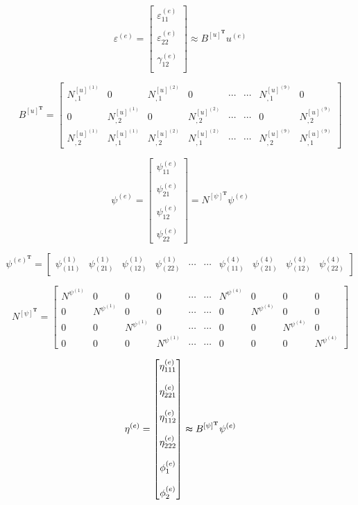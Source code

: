 \documentclass{article}
\begin{document}
\[
\varepsilon^{(e)}=
\begin{bmatrix}
\varepsilon_{11}^{(e)} \\
\\
\varepsilon_{22}^{(e)}  \\
\\
\gamma_{12}^{(e)}  \\ 
\end{bmatrix}
\approx B^{[u]^{\textbf{T}}}u^{(e)}
\]

\[
B^{[u]^\textbf{T}}=
\begin{bmatrix}
N_{,1}^{[u]^{(1)}}&0&N_{,1}^{[u]^{(2)}}&0&\cdots &\cdots& N_{,1}^{[u]^{(9)}}&0 \\
0&N_{,2}^{[u]^{(1)}}&0&N_{,2}^{[u]^{(2)}}&\cdots &\cdots& 0&N_{,2}^{[u]^{(9)}} \\
N_{,2}^{[u]^{(1)}}&N_{,1}^{[u]^{(1)}}&N_{,2}^{[u]^{(2)}}&N_{,1}^{[u]^{(2)}}&\cdots &\cdots& N_{,2}^{[u]^{(9)}}&N_{,1}^{[u]^{(9)}}
\end{bmatrix}
\]

\[
\psi^{(e)}=
\begin{bmatrix}
\psi_{11}^{(e)} \\
\\
\psi_{21}^{(e)} \\
\\
\psi_{12}^{(e)} \\
\\
\psi_{22}^{(e)}
\end{bmatrix}
=N^{[\psi]^{\textbf{T}}}\psi^{(e)}
\]

\[
\psi^{(e)^{\textbf{T}}}=
\begin{bmatrix}
\psi_{(11)}^{(1)}&\psi_{(21)}^{(1)}&\psi_{(12)}^{(1)}&\psi_{(22)}^{(1)}&\cdots &\cdots& \psi_{(11)}^{(4)}&\psi_{(21)}^{(4)}&\psi_{(12)}^{(4)}&\psi_{(22)}^{(4)}
\end{bmatrix}
\]

\[
N^{[\psi]^\textbf{T}}=
\begin{bmatrix}
N^{{\psi}^{(1)}}&0&0&0&\cdots&\cdots&N^{{\psi}^{(4)}}&0&0&0 \\
0&N^{{\psi}^{(1)}}&0&0&\cdots&\cdots&0&N^{{\psi}^{(4)}}&0&0 \\
0&0&N^{{\psi}^{(1)}}&0&\cdots&\cdots&0&0&N^{{\psi}^{(4)}}&0 \\
0&0&0&N^{{\psi}^{(1)}}&\cdots&\cdots&0&0&0&N^{{\psi}^{(4)}} 
\end{bmatrix}
\]

\[
\eta^{(e)}=
\begin{bmatrix}
\eta_{111}^{(e)} \\
\\
\eta_{221}^{(e)} \\
\\
\eta_{112}^{(e)} \\
\\
\eta_{222}^{(e)} \\
\\
\phi_{1}^{(e)} \\
\\
\phi_{2}^{(e)}
\end{bmatrix}
\thickapprox B^{[\psi]^{\textbf{T}}}\psi^{(e)}
\]
\end{document}
